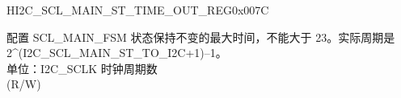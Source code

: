     \begin{register}{H}{I2C\_SCL\_MAIN\_ST\_TIME\_OUT\_REG}{0x007C}\label{regdesc:I2CSCLMAINSTTIMEOUTREG}
    \regnewline%
    \begin{regdesc}\begin{reglist}
    \label{fielddesc:I2CSCLMAINSTTOI2C}\item [I2C\_SCL\_MAIN\_ST\_TO\_I2C] 配置 SCL\_MAIN\_FSM 状态保持不变的最大时间，不能大于 23。实际周期是 2\^{}(I2C\_SCL\_MAIN\_ST\_TO\_I2C+1)–1。\\
    单位：I2C\_SCLK 时钟周期数 \\ (R/W)
    \end{reglist}\end{regdesc}
    \end{register}


